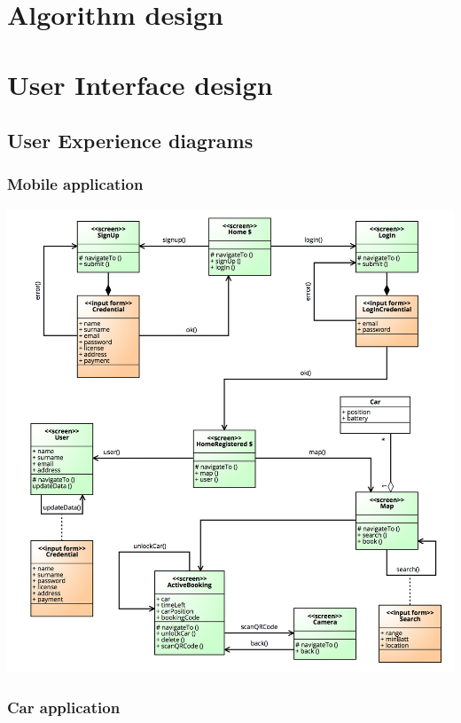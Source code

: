 \documentclass[]{article}
\begin{document}
\section{Algorithm design}\label{algorithm-design}

\section{User Interface design}\label{user-interface-design}

\subsection{User Experience diagrams}\label{user-experience-diagrams}

\subsubsection{Mobile application}\label{mobile-application-1}

\centerline{\includegraphics{./images/UX_Mobile.png}}

\subsubsection{Car application}\label{car-application}
\end{document}
